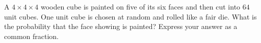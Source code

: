 A $4\times4\times4$ wooden cube is painted on five of its six faces and then cut into $64$ unit cubes. One unit cube is chosen at random and rolled like a fair die. What is the probability that the face showing is painted? Express your answer as a common fraction.
